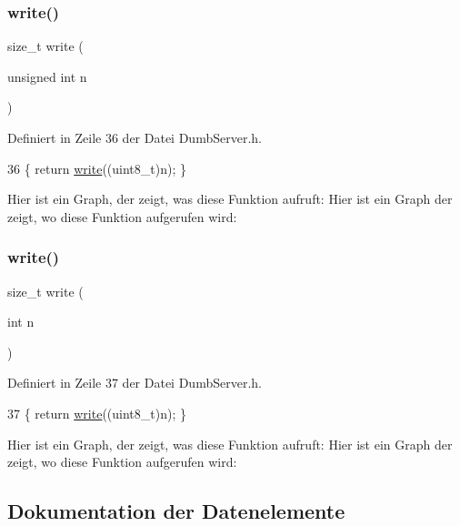 \subsubsection{\texorpdfstring{write()}{write()}\hspace{0.1cm}{\footnotesize\ttfamily [5/6]}}
{\footnotesize\ttfamily size\+\_\+t write (\begin{DoxyParamCaption}\item[{unsigned int}]{n }\end{DoxyParamCaption})\hspace{0.3cm}{\ttfamily [inline]}}



Definiert in Zeile 36 der Datei Dumb\+Server.\+h.


\begin{DoxyCode}
36 \{ \textcolor{keywordflow}{return} \hyperlink{classEspServer_a7c66fc8d559f4956d4ccea196299bca7}{write}((uint8\_t)n); \}
\end{DoxyCode}
Hier ist ein Graph, der zeigt, was diese Funktion aufruft\+:
Hier ist ein Graph der zeigt, wo diese Funktion aufgerufen wird\+:
\mbox{\label{classEspServer_a22e7ab55e0aa268cff5b48e763429ec3}} 
\subsubsection{\texorpdfstring{write()}{write()}\hspace{0.1cm}{\footnotesize\ttfamily [6/6]}}
{\footnotesize\ttfamily size\+\_\+t write (\begin{DoxyParamCaption}\item[{int}]{n }\end{DoxyParamCaption})\hspace{0.3cm}{\ttfamily [inline]}}



Definiert in Zeile 37 der Datei Dumb\+Server.\+h.


\begin{DoxyCode}
37 \{ \textcolor{keywordflow}{return} \hyperlink{classEspServer_a7c66fc8d559f4956d4ccea196299bca7}{write}((uint8\_t)n); \}
\end{DoxyCode}
Hier ist ein Graph, der zeigt, was diese Funktion aufruft\+:
Hier ist ein Graph der zeigt, wo diese Funktion aufgerufen wird\+:


\subsection{Dokumentation der Datenelemente}
\mbox{\label{classEspServer_a552aab874ad99b696f4c997d6f5a4746}} 
